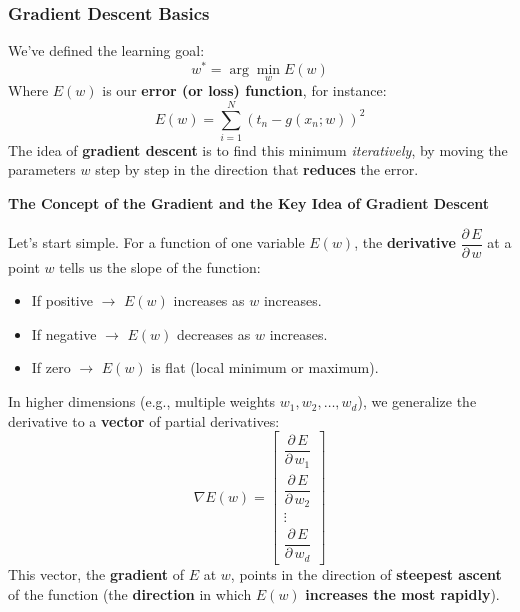 \subsubsection{Gradient Descent Basics}\label{sec:gradient-descent-basics}

We've defined the learning goal:
\begin{equation*}
    w^{*} = \arg\min_{w} E\left(w\right)
\end{equation*}
Where $E(w)$ is our \textbf{error (or loss) function}, for instance:
\begin{equation*}
    E(w) = \displaystyle\sum_{i=1}^{N} (t_{n} - g(x_{n}; w))^{2}
\end{equation*}
The idea of \textbf{gradient descent} is to find this minimum \emph{iteratively}, by moving the parameters $w$ step by step in the direction that \textbf{reduces} the error.

\highspace
\begin{flushleft}
    \textcolor{Green3}{ \textbf{The Concept of the Gradient and the Key Idea of Gradient Descent}}
\end{flushleft}
Let's start simple. For a function of one variable $E(w)$, the \textbf{derivative} $\dfrac{\partial \, E}{\partial \, w}$ at a point $w$ tells us the slope of the function:
\begin{itemize}
    \item If positive $\rightarrow$ $E(w)$ increases as $w$ increases.
    \item If negative $\rightarrow$ $E(w)$ decreases as $w$ increases.
    \item If zero $\rightarrow$ $E(w)$ is flat (local minimum or maximum).
\end{itemize}
In higher dimensions (e.g., multiple weights $w_{1}, w_{2}, \ldots, w_{d}$), we generalize the derivative to a \textbf{vector} of partial derivatives:
\begin{equation*}
    \nabla E(w) = \begin{bmatrix}
        \dfrac{\partial \, E}{\partial \, w_{1}} \\[1.2em]
        \dfrac{\partial \, E}{\partial \, w_{2}} \\[1.2em]
        \vdots \\
        \dfrac{\partial \, E}{\partial \, w_{d}}
    \end{bmatrix}
\end{equation*}
This vector, the \textbf{gradient} of $E$ at $w$, points in the direction of \textbf{steepest ascent} of the function (the \textbf{direction} in which $E(w)$ \textbf{increases the most rapidly}).

